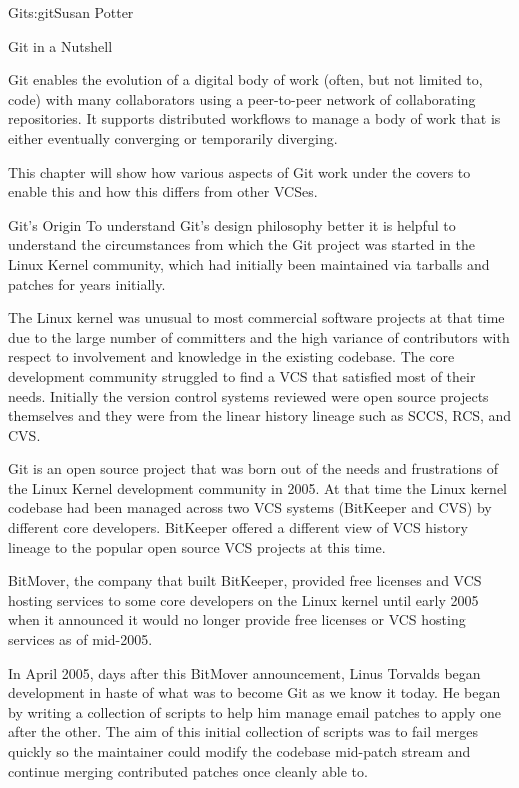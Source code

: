 \begin{aosachapter}{Git}{s:git}{Susan Potter}

\begin{aosasect1}{Git in a Nutshell}

Git enables the evolution of a digital body of work (often,
but not limited to, code) with many collaborators
using a peer-to-peer network of collaborating repositories. It
supports distributed workflows to manage a body of work that is
either eventually converging or temporarily diverging.

This chapter will show how various aspects of Git work under the covers
to enable this and how this differs from other VCSes.

\end{aosasect1}

\begin{aosasect1}{Git's Origin}
To understand Git's design philosophy better it is helpful to understand the
circumstances from which the Git project was started in the Linux Kernel
community, which had initially been maintained via tarballs and patches for
years initially.

The Linux kernel was unusual to most commercial software projects at that
time due to the large number of committers and the high variance of
contributors with respect to involvement and knowledge in the existing
codebase. The core development community struggled to find a VCS that
satisfied most of their needs. Initially the version control systems
reviewed were open source projects themselves and they were from the linear
history lineage such as SCCS, RCS, and CVS.

Git is an open source project that was born out of the needs and
frustrations of the Linux Kernel development community in 2005. At that time
the Linux kernel codebase had been managed across two VCS systems (BitKeeper
and CVS) by different core developers. BitKeeper offered a different
view of VCS history lineage to the popular open source VCS projects at this
time.

BitMover, the company that built BitKeeper, provided free licenses and VCS
hosting services to some core developers on the Linux kernel until early 2005
when it announced it would no longer provide free licenses or VCS hosting
services as of mid-2005.

In April 2005, days after this BitMover announcement, Linus Torvalds began
development in haste of what was to become Git as we know it today. He began
by writing a collection of scripts to help him manage email patches to apply
one after the other. The aim of this initial collection of scripts was to
fail merges quickly so the maintainer could modify the codebase mid-patch
stream and continue merging contributed patches once cleanly able to.


\end{aosasect1}
\end{aosachapter}
